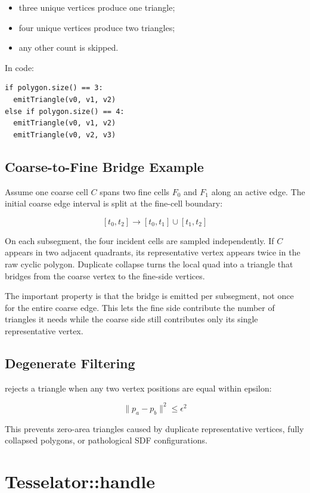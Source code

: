 \documentclass[11pt,a4paper]{article}
\newcommand{\code}[1]{\texttt{\detokenize{#1}}}
\begin{document}
\begin{itemize}
    \item three unique vertices produce one triangle;
    \item four unique vertices produce two triangles;
    \item any other count is skipped.
\end{itemize}

In code:

\begin{lstlisting}
if polygon.size() == 3:
  emitTriangle(v0, v1, v2)
else if polygon.size() == 4:
  emitTriangle(v0, v1, v2)
  emitTriangle(v0, v2, v3)
\end{lstlisting}

\subsection{Coarse-to-Fine Bridge Example}

Assume one coarse cell \(C\) spans two fine cells \(F_0\) and \(F_1\) along an active edge. The initial coarse edge interval is split at the fine-cell boundary:

\[
[t_0,t_2] \rightarrow [t_0,t_1] \cup [t_1,t_2]
\]

On each subsegment, the four incident cells are sampled independently. If \(C\) appears in two adjacent quadrants, its representative vertex appears twice in the raw cyclic polygon. Duplicate collapse turns the local quad into a triangle that bridges from the coarse vertex to the fine-side vertices.

The important property is that the bridge is emitted per subsegment, not once for the entire coarse edge. This lets the fine side contribute the number of triangles it needs while the coarse side still contributes only its single representative vertex.

\subsection{Degenerate Filtering}

\code{emitTriangle} rejects a triangle when any two vertex positions are equal within epsilon:

\[
\|p_a - p_b\|^2 \le \epsilon^2
\]

This prevents zero-area triangles caused by duplicate representative vertices, fully collapsed polygons, or pathological SDF configurations.

\section{Tesselator::handle}
\end{document}
